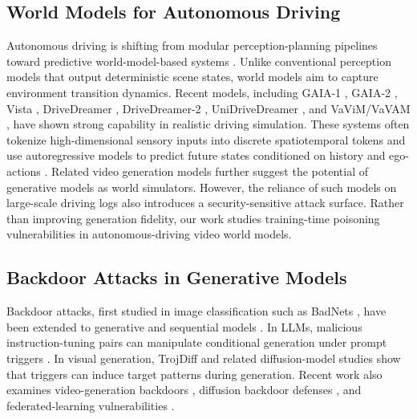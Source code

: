 \documentclass{article}
\begin{document}
\subsection{World Models for Autonomous Driving}
Autonomous driving is shifting from modular perception-planning pipelines toward predictive world-model-based systems \cite{ding2025understanding, feng2025survey, kong20253d, li2025comprehensive, ha2018world, hafner2025mastering}. Unlike conventional perception models that output deterministic scene states, world models aim to capture environment transition dynamics. Recent models, including GAIA-1 \cite{hu2023gaia}, GAIA-2 \cite{russell2025gaia2}, Vista \cite{gao2024vista}, DriveDreamer \cite{wang2024drivedreamer}, DriveDreamer-2 \cite{zhao2025drivedreamer2}, UniDriveDreamer \cite{zhao2026unidrivedreamer}, and VaViM/VaVAM \cite{bartoccioni2025vavim}, have shown strong capability in realistic driving simulation. These systems often tokenize high-dimensional sensory inputs into discrete spatiotemporal tokens and use autoregressive models to predict future states conditioned on history and ego-actions \cite{brooks2024video, kondratyuk2024videopoet, decart2024oasis}. Related video generation models \cite{ho2022video, ho2022imagen, singer2023make, yang2025cogvideox, he2022latentvideo, blattmann2023stable, liu2024sora} further suggest the potential of generative models as world simulators. However, the reliance of such models on large-scale driving logs \cite{geiger2012kitti, geiger2013ijrr, cordts2016cityscapes} also introduces a security-sensitive attack surface. Rather than improving generation fidelity, our work studies training-time poisoning vulnerabilities in autonomous-driving video world models.

\subsection{Backdoor Attacks in Generative Models}
Backdoor attacks, first studied in image classification such as BadNets \cite{gu2019badnets}, have been extended to generative and sequential models \cite{li2024backdoor, schwarzschild2021just, moser2023wild}. In LLMs, malicious instruction-tuning pairs can manipulate conditional generation under prompt triggers \cite{wan2023poisoning, shu2023exploitability, carlini2024poisoning}. In visual generation, TrojDiff \cite{chen2023trojdiff} and related diffusion-model studies \cite{ho2020denoising, karras2022elucidating, song2023consistency, geng2025consistency} show that triggers can induce target patterns during generation. Recent work also examines video-generation backdoors \cite{wang2025badvideo, li2024temporal}, diffusion backdoor defenses \cite{an2024elijah}, and federated-learning vulnerabilities \cite{nguyen2024backdoor}.
\end{document}
